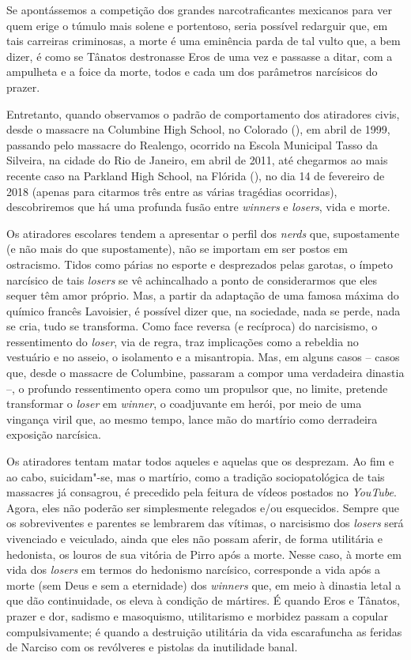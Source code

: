 Se apontássemos a competição dos grandes narcotraficantes mexicanos para
ver quem erige o túmulo mais solene e portentoso, seria possível
redarguir que, em tais carreiras criminosas, a morte é uma eminência
parda de tal vulto que, a bem dizer, é como se Tânatos destronasse Eros
de uma vez e passasse a ditar, com a ampulheta e a foice da morte, todos
e cada um dos parâmetros narcísicos do prazer.

Entretanto, quando observamos o padrão de comportamento dos atiradores
civis, desde o massacre na Columbine High School, no Colorado (), em
abril de 1999, passando pelo massacre do Realengo, ocorrido na Escola
Municipal Tasso da Silveira, na cidade do Rio de Janeiro, em abril de
2011, até chegarmos ao mais recente caso na Parkland High School, na
Flórida (), no dia 14 de fevereiro de 2018 (apenas para citarmos três
entre as várias tragédias ocorridas), descobriremos que há uma profunda
fusão entre \emph{winners} e \emph{losers}, vida e morte.

Os atiradores escolares tendem a apresentar o perfil dos \emph{nerds}
que, supostamente (e não mais do que supostamente), não se importam em
ser postos em ostracismo. Tidos como párias no esporte e desprezados
pelas garotas, o ímpeto narcísico de tais \emph{losers} se vê
achincalhado a ponto de considerarmos que eles sequer têm amor próprio.
Mas, a partir da adaptação de uma famosa máxima do químico francês
Lavoisier, é possível dizer que, na sociedade, nada se perde,
nada se cria, tudo se transforma. Como face reversa (e recíproca) do
narcisismo, o ressentimento do \emph{loser}, via de regra, traz
implicações como a rebeldia no vestuário e no asseio, o isolamento e a
misantropia. Mas, em alguns casos -- casos que, desde o massacre de
Columbine, passaram a compor uma verdadeira dinastia --, o profundo
ressentimento opera como um propulsor que, no limite, pretende
transformar o \emph{loser} em \emph{winner}, o coadjuvante em herói, por
meio de uma vingança viril que, ao mesmo tempo, lance mão do martírio
como derradeira exposição narcísica.

Os atiradores tentam matar todos aqueles e aquelas que os desprezam. Ao
fim e ao cabo, suicidam"-se, mas o martírio, como a tradição
sociopatológica de tais massacres já consagrou, é precedido pela feitura
de vídeos postados no \emph{YouTube}. Agora, eles não poderão ser
simplesmente relegados e/ou esquecidos. Sempre que os sobreviventes e
parentes se lembrarem das vítimas, o narcisismo dos \emph{losers} será
vivenciado e veiculado, ainda que eles não possam aferir, de forma
utilitária e hedonista, os louros de sua vitória de Pirro após a morte.
Nesse caso, à morte em vida dos \emph{losers} em termos do hedonismo
narcísico, corresponde a vida após a morte (sem Deus e sem a eternidade)
dos \emph{winners} que, em meio à dinastia letal a que dão continuidade,
os eleva à condição de mártires. É quando Eros e Tânatos, prazer e dor,
sadismo e masoquismo, utilitarismo e morbidez passam a copular
compulsivamente; é quando a destruição utilitária da vida escarafuncha
as feridas de Narciso com os revólveres e pistolas da inutilidade banal.

